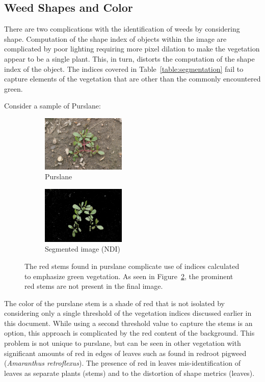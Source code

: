 \documentclass[letterpaper]{article}
\begin{document}
{\subsection{Weed Shapes and Color}
There are two complications with the identification of weeds by considering shape.  Computation of the shape index of objects within the image are complicated by poor lighting requiring more pixel dilation to make the vegetation appear to be a single plant. This, in turn, distorts the computation of the shape index of the object. The indices covered in Table~\ref{table:segmentation} fail to capture elements of the vegetation that are other than the commonly encountered green.

Consider a sample of Purslane:
\begin{figure}[H]
	\centering
	\begin{subfigure}[h]{.40\textwidth}
		\centering
		\includegraphics[width=4cm]{./figures/purslane.png}
		\caption{Purslane}
		\label{fig:purslane}
	\end{subfigure}
	\begin{subfigure}[h]{.40\textwidth}
		\centering
		\includegraphics[width=4cm]{./figures/purslane-segmented.jpg}
		\caption{Segmented image (NDI)}
		\label{fig:purslane-segmented}
	\end{subfigure}
	\caption[Color problems complicate segmentation]{The red stems found in purslane complicate use of indices calculated to emphasize green vegetation. As seen in Figure~\ref{fig:purslane-segmented}, the prominent red stems are not present in the final image.}
	\label{fig:purslane-segmentation}
\end{figure}

The color of the purslane stem is a shade of red that is not isolated by considering only a single threshold of the vegetation indices discussed earlier in this document. While using a second threshold value to capture the stems is an option, this approach is complicated by the red content of the background. This problem is not unique to purslane, but can be seen in other vegetation with significant amounts of red in edges of leaves such as found in redroot pigweed (\textit{Amaranthus retroflexus}).  The presence of red in leaves mis-identification of leaves as separate plants (stems) and to the distortion of shape metrics (leaves).



}
\end{document}
